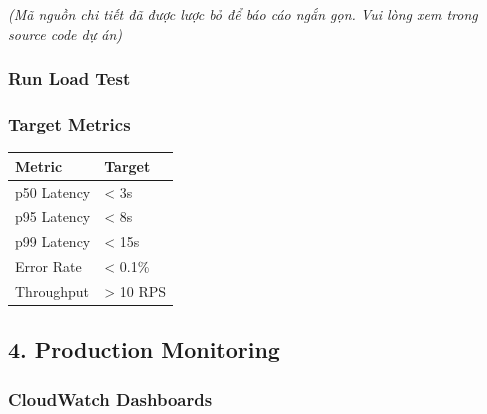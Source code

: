 \emph{(Mã nguồn chi tiết đã được lược bỏ để báo cáo ngắn gọn. Vui lòng
xem trong source code dự án)}

\hypertarget{run-load-test}{%
\subsubsection{Run Load Test}}

\begin{Shaded}
\begin{Highlighting}[]

  

 
\end{Highlighting}
\end{Shaded}

\hypertarget{target-metrics}{%
\subsubsection{Target Metrics}}

\begingroup
\small
\setlength{\tabcolsep}{3pt}
\renewcommand{\arraystretch}{1.15}
\begin{longtable}[]{@{}ll@{}}
\toprule\noalign{}
Metric & Target \\
\midrule\noalign{}
\endhead
\bottomrule\noalign{}
\endlastfoot
p50 Latency & \textless{} 3s \\
p95 Latency & \textless{} 8s \\
p99 Latency & \textless{} 15s \\
Error Rate & \textless{} 0.1\% \\
Throughput & \textgreater{} 10 RPS \\
\end{longtable}
\endgroup

\hypertarget{production-monitoring}{%
\subsection{4. Production Monitoring}}

\hypertarget{cloudwatch-dashboards}{%
\subsubsection{CloudWatch Dashboards}}

